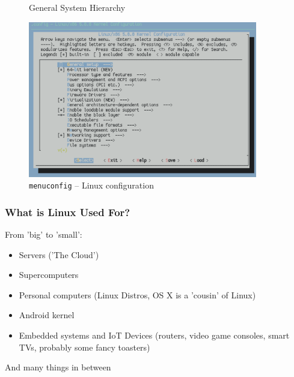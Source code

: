 \documentclass{beamer} \usetheme{Madrid}
\begin{document}
\begin{frame}
    \vfill
    \begin{center}
    \begin{figure}
        \caption{General System Hierarchy}
    \end{figure}
    \end{center}
    \vfill
\end{frame}

\begin{frame}
    \begin{figure}
        \includegraphics[width=10cm]{menuconfig.png}
        \caption{\texttt{menuconfig} -- Linux configuration}
    \end{figure}
\end{frame}

\begin{frame}
    \frametitle{What is Linux Used For?}
    From 'big' to 'small':
    \begin{itemize}
        \item Servers ('The Cloud')
        \item Supercomputers
        \item Personal computers (Linux Distros, OS X is a 'cousin' of Linux)
        \item Android kernel
        \item Embedded systems and IoT Devices (routers, video game consoles, smart TVs, probably some fancy toasters)
    \end{itemize}
    And many things in between
\end{frame}
\end{document}
